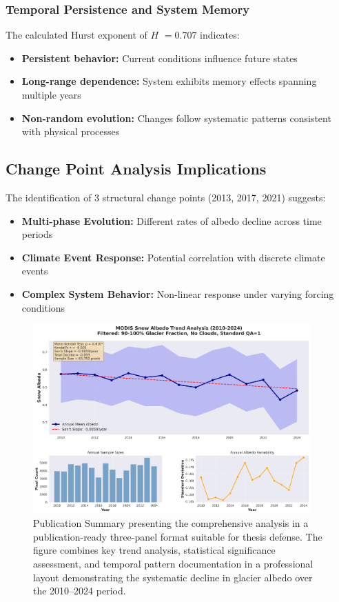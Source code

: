 \documentclass[12pt,a4paper]{article}
\newcommand{\hurst}{$H$}
\begin{document}
\subsubsection{Temporal Persistence and System Memory}

The calculated Hurst exponent of \hurst{} $= 0.707$ indicates:
\begin{itemize}
    \item \textbf{Persistent behavior:} Current conditions influence future states
    \item \textbf{Long-range dependence:} System exhibits memory effects spanning multiple years
    \item \textbf{Non-random evolution:} Changes follow systematic patterns consistent with physical processes
\end{itemize}

\subsection{Change Point Analysis Implications}

The identification of 3 structural change points (2013, 2017, 2021) suggests:
\begin{itemize}
    \item \textbf{Multi-phase Evolution:} Different rates of albedo decline across time periods
    \item \textbf{Climate Event Response:} Potential correlation with discrete climate events
    \item \textbf{Complex System Behavior:} Non-linear response under varying forcing conditions
\end{itemize}

\begin{figure}[H]
\centering
\includegraphics[width=0.95\textwidth]{../../results/plots/comprehensive_summary.png}
\caption{Publication Summary presenting the comprehensive analysis in a publication-ready three-panel format suitable for thesis defense. The figure combines key trend analysis, statistical significance assessment, and temporal pattern documentation in a professional layout demonstrating the systematic decline in glacier albedo over the 2010--2024 period.}
\label{fig:publication_summary}
\end{figure}
\end{document}
